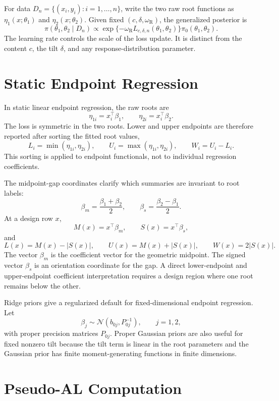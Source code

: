 \documentclass[11pt]{article}
\numberwithin{equation}{section}
\newcommand{\Normal}{\mathcal{N}}
\begin{document}
For data \(D_n=\{(x_i,y_i):i=1,\ldots,n\}\), write the two raw root functions as
\(\eta_1(x;\theta_1)\) and \(\eta_2(x;\theta_2)\). Given fixed
\((c,\delta,\omega_{\mathrm R})\), the generalized posterior is
\begin{equation}
\pi(\theta_1,\theta_2\mid D_n)
\propto
\exp\{-\omega_{\mathrm R}L_{c,\delta,n}(\theta_1,\theta_2)\}
\pi_0(\theta_1,\theta_2).
\label{eq:generalized-posterior}
\end{equation}
The learning rate controls the scale of the loss update. It is distinct from
the content \(c\), the tilt \(\delta\), and any response-distribution parameter.

\section{Static Endpoint Regression}
\label{sec:static-regression}

In static linear endpoint regression, the raw roots are
\[
\eta_{1i}=x_i^\top\beta_1,\qquad
\eta_{2i}=x_i^\top\beta_2.
\]
The loss is symmetric in the two roots. Lower and upper endpoints are therefore
reported after sorting the fitted root values,
\[
L_i=\min(\eta_{1i},\eta_{2i}),\qquad
U_i=\max(\eta_{1i},\eta_{2i}),\qquad
W_i=U_i-L_i.
\]
This sorting is applied to endpoint functionals, not to individual regression
coefficients.

The midpoint-gap coordinates clarify which summaries are invariant to root
labels:
\[
\beta_m=\frac{\beta_1+\beta_2}{2},
\qquad
\beta_s=\frac{\beta_2-\beta_1}{2}.
\]
At a design row \(x\),
\[
M(x)=x^\top\beta_m,\qquad
S(x)=x^\top\beta_s,
\]
and
\[
L(x)=M(x)-|S(x)|,\qquad
U(x)=M(x)+|S(x)|,\qquad
W(x)=2|S(x)|.
\]
The vector \(\beta_m\) is the coefficient vector for the geometric midpoint.
The signed vector \(\beta_s\) is an orientation coordinate for the gap. A direct
lower-endpoint and upper-endpoint coefficient interpretation requires a design
region where one root remains below the other.

Ridge priors give a regularized default for fixed-dimensional endpoint regression.
Let
\[
\beta_j\sim\Normal(b_{0j},P_{0j}^{-1}),\qquad j=1,2,
\]
with proper precision matrices \(P_{0j}\). Proper Gaussian priors are also
useful for fixed nonzero tilt because the tilt term is linear in the root
parameters and the Gaussian prior has finite moment-generating functions in
finite dimensions.

\section{Pseudo-AL Computation}
\label{sec:pseudo-al}
\end{document}
